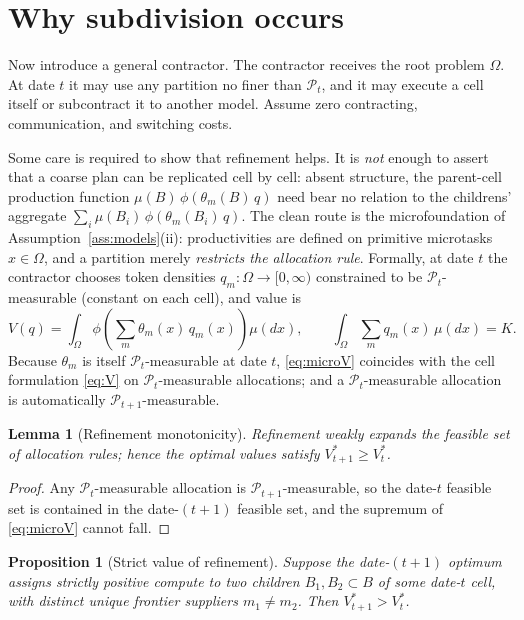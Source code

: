 \documentclass[11pt]{article}
\newtheorem{proposition}{Proposition}
\newtheorem{lemma}{Lemma}
\theoremstyle{definition}
\theoremstyle{remark}
\begin{document}
\section{Why subdivision occurs}
\label{sec:subdivision}

Now introduce a general contractor. The contractor receives the root problem $\Omega$. At date $t$ it may use any partition no finer than $\mathcal{P}_t$, and it may execute a cell itself or subcontract it to another model. Assume zero contracting, communication, and switching costs.

Some care is required to show that refinement helps. It is \emph{not} enough to assert that a coarse plan can be replicated cell by cell: absent structure, the parent-cell production function $\mu(B)\,\phi(\theta_m(B)\,q)$ need bear no relation to the childrens' aggregate $\sum_i \mu(B_i)\,\phi(\theta_m(B_i)\,q)$. The clean route is the microfoundation of Assumption~\ref{ass:models}(ii): productivities are defined on primitive microtasks $x \in \Omega$, and a partition merely \emph{restricts the allocation rule}. Formally, at date $t$ the contractor chooses token densities $q_m : \Omega \to [0,\infty)$ constrained to be $\mathcal{P}_t$-measurable (constant on each cell), and value is
\begin{equation}
\label{eq:microV}
V(q) = \int_\Omega \phi\!\left( \sum_m \theta_m(x)\, q_m(x) \right) \mu(dx),
\qquad
\int_\Omega \sum_m q_m(x)\, \mu(dx) = K.
\end{equation}
Because $\theta_m$ is itself $\mathcal{P}_t$-measurable at date $t$, \eqref{eq:microV} coincides with the cell formulation \eqref{eq:V} on $\mathcal{P}_t$-measurable allocations; and a $\mathcal{P}_t$-measurable allocation is automatically $\mathcal{P}_{t+1}$-measurable.

\begin{lemma}[Refinement monotonicity]
\label{lem:monotone}
Refinement weakly expands the feasible set of allocation rules; hence the optimal values satisfy $V^*_{t+1} \ge V^*_t$.
\end{lemma}

\begin{proof}
Any $\mathcal{P}_t$-measurable allocation is $\mathcal{P}_{t+1}$-measurable, so the date-$t$ feasible set is contained in the date-$(t{+}1)$ feasible set, and the supremum of \eqref{eq:microV} cannot fall.
\end{proof}

\begin{proposition}[Strict value of refinement]
\label{prop:strict}
Suppose the date-$(t{+}1)$ optimum assigns strictly positive compute to two children $B_1, B_2 \subset B$ of some date-$t$ cell, with distinct unique frontier suppliers $m_1 \neq m_2$. Then $V^*_{t+1} > V^*_t$.
\end{proposition}
\end{document}
